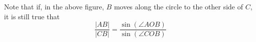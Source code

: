 \documentclass{ximera}
\begin{document}
\begin{remark}
Note that if, in the above figure, $B$ moves along the
circle to the other side of $C$, it is still true that%
\[
\frac{\left\vert AB\right\vert }{\left\vert CB\right\vert }=\frac
{\sin\left(  \angle AOB\right)  }{\sin\left(  \angle
COB\right)  }%
\]
\end{remark}
\end{document}
